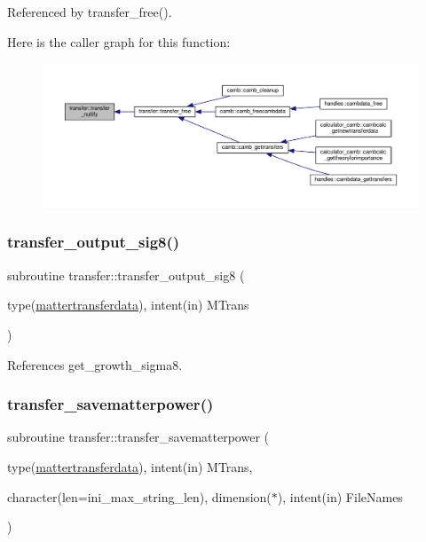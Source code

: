 Referenced by transfer\+\_\+free().

Here is the caller graph for this function\+:
\nopagebreak
\begin{figure}[H]
\begin{center}
\leavevmode
\includegraphics[width=350pt]{namespacetransfer_a0e02ff3d1ba9dd5ad8c5dcaf76987ecc_icgraph}
\end{center}
\end{figure}
\mbox{\label{namespacetransfer_a7f7da292010e79184bed8cdb24e03d2b}} 
\subsubsection{\texorpdfstring{transfer\+\_\+output\+\_\+sig8()}{transfer\_output\_sig8()}}
{\footnotesize\ttfamily subroutine transfer\+::transfer\+\_\+output\+\_\+sig8 (\begin{DoxyParamCaption}\item[{type(\mbox{\hyperlink{structtransfer_1_1mattertransferdata}{mattertransferdata}}), intent(in)}]{M\+Trans }\end{DoxyParamCaption})}



References get\+\_\+growth\+\_\+sigma8.

\mbox{\label{namespacetransfer_a4204b279b39e55f31b7948dec07fd7ed}} 
\subsubsection{\texorpdfstring{transfer\+\_\+savematterpower()}{transfer\_savematterpower()}}
{\footnotesize\ttfamily subroutine transfer\+::transfer\+\_\+savematterpower (\begin{DoxyParamCaption}\item[{type(\mbox{\hyperlink{structtransfer_1_1mattertransferdata}{mattertransferdata}}), intent(in)}]{M\+Trans,  }\item[{character(len=ini\+\_\+max\+\_\+string\+\_\+len), dimension($\ast$), intent(in)}]{File\+Names }\end{DoxyParamCaption})}



